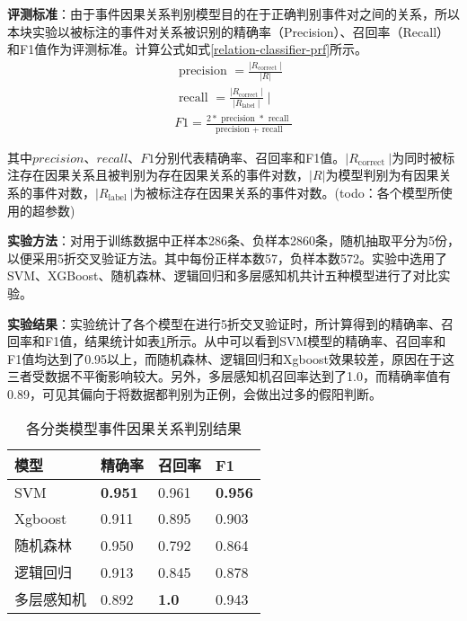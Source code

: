 \textbf{评测标准}：由于事件因果关系判别模型目的在于正确判别事件对之间的关系，所以本块实验以被标注的事件对关系被识别的精确率（Precision）、召回率（Recall）和F1值作为评测标准。计算公式如式\ref{relation-classifier-prf}所示。
\begin{equation}
    \begin{array}{c}
    \text { precision }=\frac{\left|R_{\text {correct }}\right|}{|R|} \\
    \text { recall }=\frac{\left|R_{\text {correct }}\right|}{\left|R_{\text {label }}\right|} \mid \\
    F 1=\frac{2 * \text { precision } * \text { recall }}{\text { precision }+\text { recall }}
    \end{array}
    \label{relation-classifier-prf}
\end{equation}

其中$precision$、$recall$、$F1$分别代表精确率、召回率和F1值。$\left|R_{\text {correct }}\right|$为同时被标注存在因果关系且被判别为存在因果关系的事件对数，$|R|$为模型判别为有因果关系的事件对数，$\left|R_{\text {label }}\right|$为被标注存在因果关系的事件对数。(todo：各个模型所使用的超参数)

\textbf{实验方法}：对用于训练数据中正样本286条、负样本2860条，随机抽取平分为5份，以便采用5折交叉验证方法。其中每份正样本数57，负样本数572。实验中选用了SVM、XGBoost、随机森林、逻辑回归和多层感知机共计五种模型进行了对比实验。

\textbf{实验结果}：实验统计了各个模型在进行5折交叉验证时，所计算得到的精确率、召回率和F1值，结果统计如表\ref{cause-relation-result}所示。从中可以看到SVM模型的精确率、召回率和F1值均达到了0.95以上，而随机森林、逻辑回归和Xgboost效果较差，原因在于这三者受数据不平衡影响较大。另外，多层感知机召回率达到了1.0，而精确率值有0.89，可见其偏向于将数据都判别为正例，会做出过多的假阳判断。
\begin{table}[]
    \caption{各分类模型事件因果关系判别结果}
    \centering
    \label{cause-relation-result}
    \begin{tabular}{llll}
    \hline
    模型      & 精确率            & 召回率          & F1             \\ \hline
    SVM     & \textbf{0.951} & 0.961        & \textbf{0.956} \\
    Xgboost & 0.911          & 0.895        & 0.903          \\
    随机森林    & 0.950          & 0.792        & 0.864          \\
    逻辑回归    & 0.913          & 0.845        & 0.878          \\
    多层感知机   & 0.892          & \textbf{1.0} & 0.943          \\ \hline
    \end{tabular}
\end{table}

